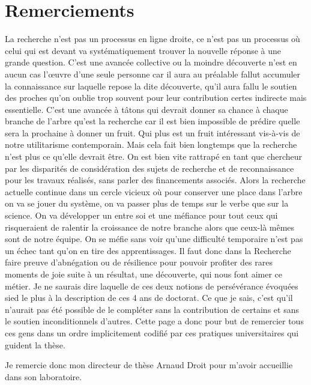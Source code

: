 \chapter*{Remerciements}         %

La recherche n'est pas un processus en ligne droite, ce n'est pas un processus où celui qui est devant va systématiquement trouver la nouvelle réponse à une grande question. C'est une avancée collective ou la moindre découverte n'est en aucun cas l'œuvre d'une seule personne car il aura au préalable fallut accumuler la connaissance sur laquelle repose la dite découverte, qu'il aura fallu le soutien des proches qu'on oublie trop souvent pour leur contribution certes indirecte mais essentielle. C'est une avancée à tâtons qui devrait donner sa chance à chaque branche de l'arbre qu'est la recherche car il est bien impossible de prédire quelle sera la prochaine à donner un fruit. Qui plus est un fruit intéressant vis-à-vis de notre utilitarisme contemporain.
Mais cela fait bien longtemps que la recherche n'est plus ce qu'elle devrait être. On est bien vite rattrapé en tant que chercheur par les disparités de considération des sujets de recherche et de reconnaissance pour les travaux réalisés, sans parler des financements associés. Alors la recherche actuelle continue dans un cercle vicieux où pour conserver une place dans l'arbre on va se jouer du système, on va passer plus de temps sur le verbe que sur la science. On va développer un entre soi et une méfiance pour tout ceux qui risqueraient de ralentir la croissance de notre branche alors que ceux-là mêmes sont de notre équipe. On se méfie sans voir qu'une difficulté temporaire n'est pas un échec tant qu'on en tire des apprentissages. Il faut donc dans la Recherche faire preuve d'abnégation ou de résilience pour pouvoir profiter des rares moments de joie suite à un résultat, une découverte, qui nous font aimer ce métier. Je ne saurais dire laquelle de ces deux notions de persévérance évoquées sied le plus à la description de ces 4 ans de doctorat. Ce que je sais, c'est qu'il n'aurait pas été possible de le compléter sans la contribution de certains et sans le soutien inconditionnels d'autres. Cette page a donc pour but de remercier tous ces gens dans un ordre implicitement codifié par ces pratiques universitaires qui guident la thèse.

Je remercie donc mon directeur de thèse Arnaud Droit pour m'avoir accueillie dans son laboratoire.

